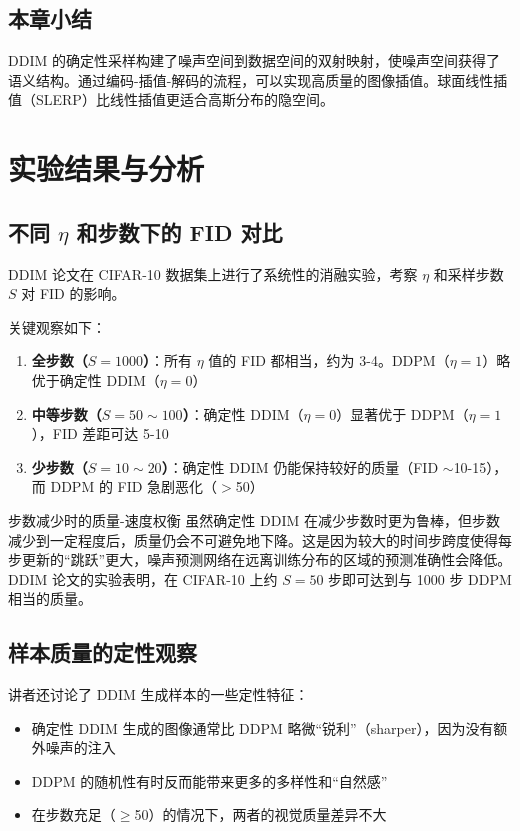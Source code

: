 \documentclass[a4paper]{article}
\begin{document}
\subsection{本章小结}

DDIM 的确定性采样构建了噪声空间到数据空间的双射映射，使噪声空间获得了语义结构。通过编码-插值-解码的流程，可以实现高质量的图像插值。球面线性插值（SLERP）比线性插值更适合高斯分布的隐空间。


\section{实验结果与分析}

\subsection{不同 $\eta$ 和步数下的 FID 对比}

DDIM 论文在 CIFAR-10 数据集上进行了系统性的消融实验，考察 $\eta$ 和采样步数 $S$ 对 FID 的影响。

关键观察如下：

\begin{enumerate}
    \item \textbf{全步数（$S=1000$）}：所有 $\eta$ 值的 FID 都相当，约为 3-4。DDPM（$\eta=1$）略优于确定性 DDIM（$\eta=0$）
    \item \textbf{中等步数（$S=50\sim100$）}：确定性 DDIM（$\eta=0$）显著优于 DDPM（$\eta=1$），FID 差距可达 5-10
    \item \textbf{少步数（$S=10\sim20$）}：确定性 DDIM 仍能保持较好的质量（FID $\sim$10-15），而 DDPM 的 FID 急剧恶化（$>$50）
\end{enumerate}

\begin{warningbox}{步数减少时的质量-速度权衡}
虽然确定性 DDIM 在减少步数时更为鲁棒，但步数减少到一定程度后，质量仍会不可避免地下降。这是因为较大的时间步跨度使得每步更新的``跳跃''更大，噪声预测网络在远离训练分布的区域的预测准确性会降低。DDIM 论文的实验表明，在 CIFAR-10 上约 $S=50$ 步即可达到与 1000 步 DDPM 相当的质量。
\end{warningbox}

\subsection{样本质量的定性观察}

讲者还讨论了 DDIM 生成样本的一些定性特征：

\begin{itemize}
    \item 确定性 DDIM 生成的图像通常比 DDPM 略微``锐利''（sharper），因为没有额外噪声的注入
    \item DDPM 的随机性有时反而能带来更多的多样性和``自然感''
    \item 在步数充足（$\geq$50）的情况下，两者的视觉质量差异不大
\end{itemize}
\end{document}
